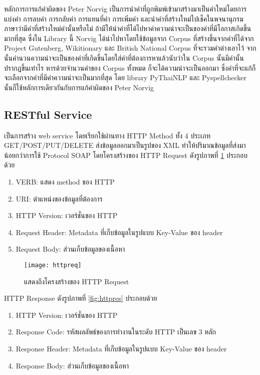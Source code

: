 หลักการการแก้คำผิดของ Peter Norvig\cite{norvig} เป็นการนำคำที่ถูกพิมพ์เข้ามาสร้างมาเป็นคำใหม่โดยการแบ่งคำ การลบคำ การกลับคำ การแทนที่คำ การเพิ่มคำ 
และนำคำที่สร้างใหม่ไปเช็คในพจนานุกรมภาษาว่ามีคำที่สร้างใหม่คำนั้นหรือไม่ ถ้ามีให้นำคำที่ได้ไปหาค่าความน่าจะเป็นของคำที่มีโอกาสเกิดขึ้นมากที่สุด ซึ่งใน Library 
นี้ Norvig ได้นำไปหาโดยใช้ข้อมูลจาก Corpus ที่สร้างขึ้นจากคำที่ได้จาก Project Gutenberg\cite{guten}, Wikitionary\cite{wikitionary} และ British 
National Corpus\cite{kilgarriff} ที่จะรวมคำต่างเอาไว้ จากนั้นคำนวนความน่าจะเป็นของคำที่เกิดขึ้นโดยใส่คำที่ต้องการหาแล้วนับว่าใน Corpus นั้นมีคำนั้นปรากฏขึ้นเท่าไร
หารด้วยจำนวนคำของ Corpus ทั้งหมด ก็จะได้ความน่าจะเป็นออกมา ซึ่งคำที่จะแก้ก็จะเลือกจากคำที่มีค่าความน่าจะเป็นมากที่สุด โดย library PyThaiNLP\cite{pythainlp} และ Pyspellchecker\cite{pypi} 
นั้นก็ใช้หลักการเดียวกันกับการแก้คำผิดของ Peter Norvig 

\subsection{RESTful Service}
เป็นการสร้าง web service โดยเรียกใช้ผ่านทาง HTTP Method ทั้ง 4 ประเภท GET/POST/PUT/DELETE ส่งข้อมูลออกมาเป็นรูปของ XML ทำให้ปริมาณข้อมูลที่ส่งมาน้อยกว่าการใช้ Protocol SOAP  โดยโครงสร้างของ 
HTTP Request ดังรูปภาพที่ \ref{fig:httpreq} ประกอบด้วย 

\begin{enumerate}
 \item VERB: แสดง method ของ HTTP
 \item URI: ตำแหน่งของข้อมูลที่ต้องการ
 \item HTTP Version: เวอร์ชั่นของ HTTP
 \item Request Header: Metadata ที่เก็บข้อมูลในรูปแบบ Key-Value ของ header
 \item Request Body: ส่วนเก็บข้อมูลของเนื้อหา
\end{enumerate}

\begin{figure}[H]
    \centering
    \texttt{[image: httpreq]}
    \caption{แสดงถึงโครงสร้างของ HTTP Request \cite{Saixiii}}\label{fig:httpreq}
\end{figure}

HTTP Response ดังรูปภาพที่ \ref{fig:httpres} ประกอบด้วย


\begin{enumerate}
	\item HTTP Version: เวอร์ชั่นของ HTTP
	\item Response Code: รหัสผลลัพธ์ของการทำงานในระดับ HTTP เป็นเลข 3 หลัก
	\item Response Header: Metadata ที่เก็บข้อมูลในรูปแบบ Key-Value ของ header
	\item Response Body: ส่วนเก็บข้อมูลของเนื้อหา

   \end{enumerate}
   

